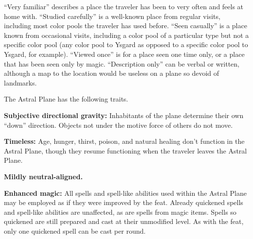 
``Very familiar'' describes a place the traveler has been to very often and feels at home with. ``Studied carefully'' is a well-known place from regular visits, including most color pools the traveler has used before. ``Seen casually'' is a place known from occasional visits, including a color pool of a particular type but not a specific color pool (any color pool to Ysgard as opposed to a specific color pool to Ysgard, for example). ``Viewed once'' is for a place seen one time only, or a place that has been seen only by magic. ``Description only'' can be verbal or written, although a map to the location would be useless on a plane so devoid of landmarks.


The Astral Plane has the following traits.
\begin{itemize*}
\item \textbf{Subjective directional gravity:} Inhabitants of the plane determine their own ``down'' direction. Objects not under the motive force of others do not move.
\item \textbf{Timeless:} Age, hunger, thirst, poison, and natural healing don't function in the Astral Plane, though they resume functioning when the traveler leaves the Astral Plane.
\item \textbf{Mildly neutral-aligned.}
\item \textbf{Enhanced magic:} All spells and spell-like abilities used within the Astral Plane may be employed as if they were improved by the  feat. Already quickened spells and spell-like abilities are unaffected, as are spells from magic items. Spells so quickened are still prepared and cast at their unmodified level. As with the  feat, only one quickened spell can be cast per round.
\end{itemize*}
